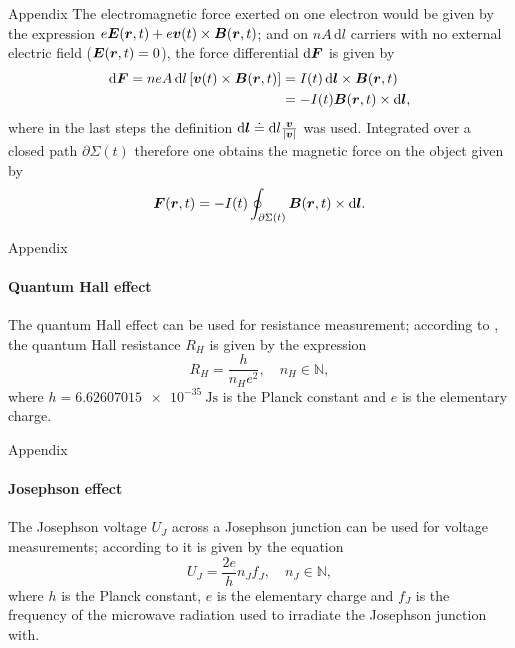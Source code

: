 \documentclass{beamer}
\begin{document}
\begin{frame}[allowframebreaks]{Appendix}
 The electromagnetic force exerted on one electron would be given by the expression $e\bm{E}(\bm{r},t) + e\bm{v}(t) \times \bm{B}(\bm{r},t)$; and on $nA\,\mathrm{d}l$ carriers with no external electric field ($\bm{E}(\bm{r},t) = 0$), the force differential $\mathrm{d}\bm{F}$ is given by 
 \begin{align}\begin{aligned}
		\mathrm{d}\bm{F} = neA\,\mathrm{d}l \left[\bm{v}(t)\times \bm{B}(\bm{r},t)\right] &= I(t)\,\mathrm{d}\bm{l}\times \bm{B}(\bm{r},t) \\ &= -I(t)\bm{B}(\bm{r},t)\times \mathrm{d}\bm{l},
	\end{aligned}\end{align} where in the last steps the definition $\mathrm{d}\bm{l} \doteq \mathrm{d}l\frac{\bm{v}}{|\bm{v}|}$ was used. Integrated over a closed path $\partial \Sigma(t)$ therefore one obtains the magnetic force on the object given by \begin{equation}\label{eq:watt_bal_fund_eq_2}
	\bm{F}(\bm{r},t) = -I(t)\oint_{\partial \Sigma(t)} \bm{B}(\bm{r},t)\times \mathrm{d}\bm{l}.
	\end{equation}
\end{frame}

\begin{frame}[allowframebreaks]{Appendix}
\framesubtitle{Quantum Hall effect}
\justifying
	The quantum Hall effect can be used for resistance measurement; according to \cite{B_Jeckelmann_2001}, the quantum Hall resistance $R_H$ is given by the expression \begin{equation}\label{eq:quantumhalleffect}
		R_H = \frac{h}{n_He^2}, \quad n_H \in \mathbb{N},
	\end{equation} where $h = \SI{6.62607015e-35}{\joule\second}$ is the Planck constant and $e$ is the elementary charge.
\end{frame}

\begin{frame}[allowframebreaks]{Appendix}
\framesubtitle{Josephson effect}
\justifying
	The Josephson voltage $U_J$ across a Josephson junction can be used for voltage measurements; according to \cite{Kajastie_2009} it is given by the equation \begin{equation}\label{eq:josephsoneffect}
		U_J = \frac{2e}{h}n_Jf_J, \quad n_J \in \mathbb{N},
	\end{equation} where $h$ is the Planck constant, $e$ is the elementary charge and $f_J$ is the frequency of the microwave radiation used to irradiate the Josephson junction with.
\end{frame}
\end{document}
